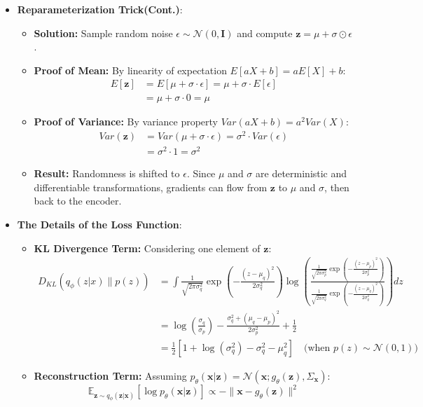 \documentclass[UTF8]{ctexart}
\begin{document}
\begin{itemize}
    \item \textbf{Reparameterization Trick(Cont.)}:
    \begin{itemize}
        \item \textbf{Solution:} Sample random noise $\epsilon \sim \mathcal{N}(0, \mathbf{I})$ 
        and compute $\mathbf{z} = \mu + \sigma \odot \epsilon$.
        \item \textbf{Proof of Mean:} By linearity of expectation $E[aX + b] = aE[X] + b$:
        \begin{align*}
            E[\mathbf{z}] &= E[\mu + \sigma \cdot \epsilon] = \mu + \sigma \cdot E[\epsilon] \\
            &= \mu + \sigma \cdot 0 = \mu
        \end{align*}
        \item \textbf{Proof of Variance:} By variance property $Var(aX + b) = a^2 Var(X)$:
        \begin{align*}
            Var(\mathbf{z}) &= Var(\mu + \sigma \cdot \epsilon) = \sigma^2 \cdot Var(\epsilon) \\
            &= \sigma^2 \cdot 1 = \sigma^2
        \end{align*}
        \item \textbf{Result:} Randomness is shifted to $\epsilon$.
        Since $\mu$ and $\sigma$ are deterministic and differentiable transformations, 
        gradients can flow from $\mathbf{z}$ to $\mu$ and $\sigma$, then back to the encoder.
    \end{itemize}

    \item \textbf{The Details of the Loss Function}:
    \begin{itemize}
        \item \textbf{KL Divergence Term:} Considering one element of $\mathbf{z}$:
        \begin{align*}
            D_{KL} (q_\phi (z|x) \| p(z)) &= \int \frac{1}{\sqrt{2\pi\sigma_q^2}} 
            \exp \left( -\frac{(z - \mu_q)^2}{2\sigma_q^2} \right) \log \left( \frac{\frac{1}{\sqrt{2\pi\sigma_p^2}} \exp \left( -\frac{(z - \mu_p)^2}{2\sigma_p^2} \right)}
            {\frac{1}{\sqrt{2\pi\sigma_q^2}} \exp \left( -\frac{(z - \mu_q)^2}{2\sigma_q^2} \right)} \right) dz \\
            &= \log \left( \frac{\sigma_q}{\sigma_p} \right) - \frac{\sigma_q^2 + (\mu_q - \mu_p)^2}{2\sigma_p^2} + \frac{1}{2} \\
            &= \frac{1}{2} \left[ 1 + \log(\sigma_q^2) - \sigma_q^2 - \mu_q^2 \right] \quad \text{(when } p(z) \sim \mathcal{N}(0, 1))
        \end{align*}
        \item \textbf{Reconstruction Term:} Assuming $p_\theta(\mathbf{x}|\mathbf{z}) = \mathcal{N}(\mathbf{x}; g_\theta(\mathbf{z}), \Sigma_{\mathbf{x}})$:
        $$\mathbb{E}_{\mathbf{z} \sim q_\phi(\mathbf{z}|\mathbf{x})}[\log p_\theta(\mathbf{x}|\mathbf{z})] \propto -\|\mathbf{x} - g_\theta(\mathbf{z})\|^2$$
    \end{itemize} 


\end{itemize}
\end{document}
